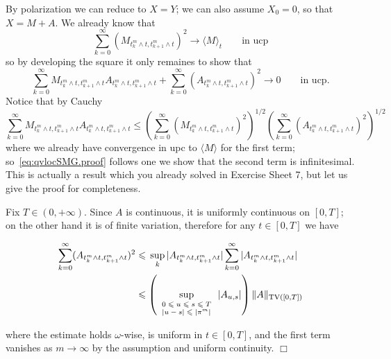 \documentclass{article}
\newcommand{\tmscript}[1]{\text{\scriptsize{$#1$}}}
\newcommand{\textbf}[1]{\text{{\bfseries{#1}}}}
\newenvironment{proof}{\noindent\textbf{Proof\ }}{\hspace*{\fill}$\Box$\medskip}
\newcommand{\1}{\1}
\begin{document}
{\begin{proof}
  By polarization we can reduce to $X = Y$; we can also assume $X_0 = 0$, so
  that $X = M + A$. We already know that
  \[ \sum_{k = 0}^{\infty} (M_{t^m_k \wedge t, t^m_{k + 1} \wedge t})^2
     \rightarrow \langle M \rangle_t \qquad \text{in ucp} \]
  so by developing the square it only remaines to show that
  \begin{equation}
    \sum_{k = 0}^{\infty} M_{t^m_k \wedge t, t^m_{k + 1} \wedge t} A_{t^m_k
    \wedge t, t^m_{k + 1} \wedge t} + \sum_{k = 0}^{\infty}  (A_{t^m_k \wedge
    t, t^m_{k + 1} \wedge t})^2 \rightarrow 0 \qquad \text{in ucp} .
    \label{eq:qvlocSMG.proof}
  \end{equation}
  Notice that by Cauchy
  \[ \sum_{k = 0}^{\infty} M_{t^m_k \wedge t, t^m_{k + 1} \wedge t} A_{t^m_k
     \wedge t, t^m_{k + 1} \wedge t} \leqslant \left( \sum_{k = 0}^{\infty}
     (M_{t^m_k \wedge t, t^m_{k + 1} \wedge t})^2 \right)^{1 / 2}  \left(
     \sum_{k = 0}^{\infty} (A_{t^m_k \wedge t, t^m_{k + 1} \wedge t})^2
     \right)^{1 / 2} \]
  where we already have convergence in upc to $\langle M \rangle$ for the
  first term; so~\eqref{eq:qvlocSMG.proof} follows one we show that the second
  term is infinitesimal. This is actually a result which you already solved in
  Exercise Sheet 7, but let us give the proof for completeness.
  
  Fix $T \in (0, + \infty)$. Since $A$ is continuous, it is uniformly
  continuous on $[0, T]$; on the other hand it is of finite variation,
  therefore for any $t \in [0, T]$ we have
  
  \begin{align*}
    \sum_{k = 0}^{\infty} (A_{t^m_k \wedge t, t^m_{k + 1} \wedge t})^2 &
    \leqslant \, \sup_k | A_{t^m_k \wedge t, t^m_{k + 1} \wedge t} |  \sum_{k
    = 0}^{\infty} | A_{t^m_k \wedge t, t^m_{k + 1} \wedge t} |\\
    & \leqslant \left( \sup_{\tmscript{\begin{array}{l}
      0 \leqslant u \leqslant s \leqslant T\\
      | u - s | \leqslant | \pi^m |
    \end{array}}} | A_{u, s} | \right)  \| A \|_{\operatorname{TV} ([0, T])}
  \end{align*}
  
  where the estimate holds $\omega$-wise, is uniform in $t \in [0, T]$, and
  the first term vanishes as $m \rightarrow \infty$ by the assumption and
  uniform continuity.
\end{proof}

}
\end{document}
